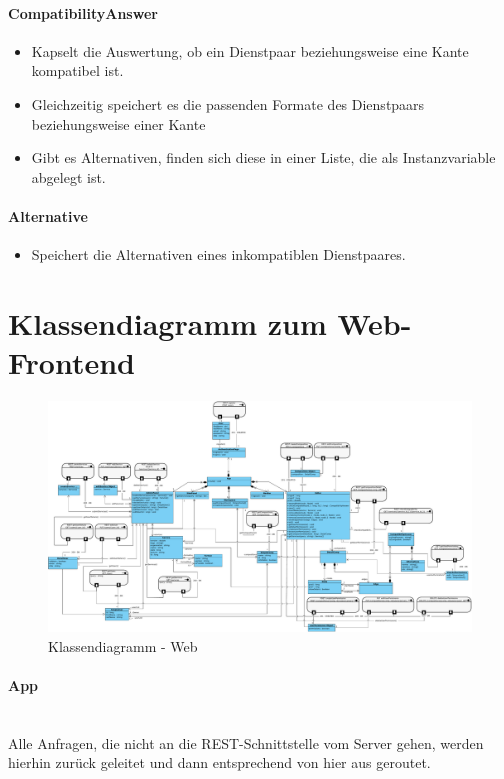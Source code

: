 \paragraph{CompatibilityAnswer}
\begin{itemize}
	\item Kapselt die Auswertung, ob ein Dienstpaar beziehungsweise eine Kante kompatibel ist. 
	\item Gleichzeitig speichert es die passenden Formate des Dienstpaars beziehungsweise einer Kante
	\item Gibt es Alternativen, finden sich diese in einer Liste, die als Instanzvariable abgelegt ist.
\end{itemize}
\paragraph{Alternative} 
\begin{itemize}
	\item Speichert die Alternativen eines inkompatiblen Dienstpaares.
\end{itemize}

\newpage
\section*{Klassendiagramm zum Web-Frontend}

\begin{figure}[!h]
	\centering
	\includegraphics[width=\textwidth]{img/Diagramme/Klassen/Frontend}
	\caption{Klassendiagramm - Web}
	\label{fig:klassendiagramm-web}
\end{figure}

\paragraph{App}\mbox{}\\
Alle Anfragen, die nicht an die REST-Schnittstelle vom Server gehen, werden hierhin zurück geleitet
und dann entsprechend von hier aus geroutet.
